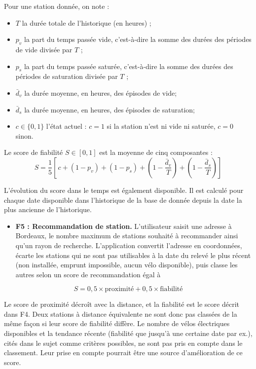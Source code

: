 \documentclass[
  french,
  11pt,
  a4paper,
]{article}
\providecommand{\tightlist}{%
  \setlength{\itemsep}{0pt}\setlength{\parskip}{0pt}}
\begin{document}
Pour une station donnée, on note :

\begin{itemize}
  \item $T$ la durée totale de l'historique (en heures) ;
  \item $p_v$ la part du temps passée vide, c'est-à-dire
        la somme des durées des périodes de vide divisée par $T$ ;
  \item $p_s$ la part du temps passée saturée, c'est-à-dire
        la somme des durées des périodes de saturation divisée par $T$ ;
  \item $\bar{d}_v$ la durée moyenne, en heures, des épisodes de vide;
  \item $\bar{d}_s$ la durée moyenne, en heures, des épisodes de saturation;
  \item $c \in \{0, 1\}$ l'état actuel : $c = 1$ si la station n'est ni vide ni saturée,
        $c = 0$ sinon.
\end{itemize}

Le score de fiabilité \(S \in [0, 1]\) est la moyenne de cinq
composantes : \begin{equation}
  S = \frac{1}{5}\left[\, c + (1 - p_v) + (1 - p_s)
      + \left(1 - \frac{\bar{d}_v}{T}\right)
      + \left(1 - \frac{\bar{d}_s}{T}\right) \right]
\end{equation}

L'évolution du score dans le temps est également disponible. Il est
calculé pour chaque date disponible dans l'historique de la base de
donnée depuis la date la plus ancienne de l'historique.

\begin{itemize}
\tightlist
\item
  \textbf{F5 : Recommandation de station.} L'utilisateur saisit une
  adresse à Bordeaux, le nombre maximum de stations souhaité à
  recommander ainsi qu'un rayon de recherche. L'application convertit
  l'adresse en coordonnées, écarte les stations qui ne sont pas
  utilisables à la date du relevé le plus récent (non installée, emprunt
  impossible, aucun vélo disponible), puis classe les autres selon un
  score de recommandation égal à
\end{itemize}

\begin{equation}
  S = 0,5 \times \textrm{proximité} + 0,5 \times \textrm{fiabilité}
\end{equation}

Le score de proximité décroît avec la distance, et la fiabilité est le
score décrit dans F4. Deux stations à distance équivalente ne sont donc
pas classées de la même façon si leur score de fiabilité diffère. Le
nombre de vélos électriques disponibles et la tendance récente
(fiabilité que jusqu'à une certaine date par ex.), cités dans le sujet
comme critères possibles, ne sont pas pris en compte dans le classement.
Leur prise en compte pourrait être une source d'amélioration de ce
score.
\end{document}
